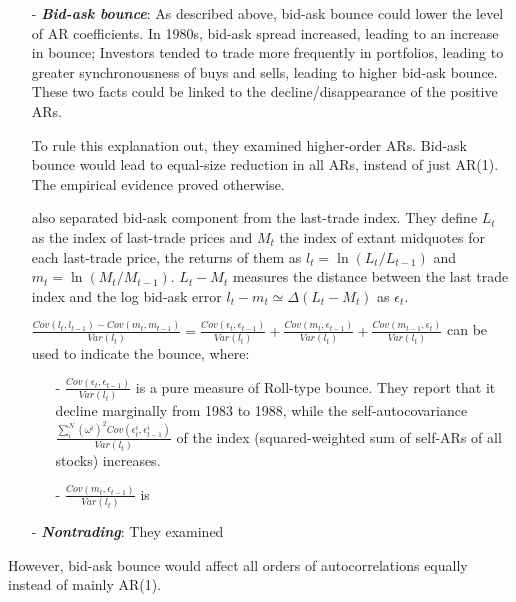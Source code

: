 \begin{enumerate}
    \item[-] \textbf{\textit{Bid-ask bounce}}: As described above, bid-ask bounce could lower the level of AR coefficients. In 1980s, bid-ask spread increased, leading to an increase in bounce; Investors tended to
    trade more frequently in portfolios, leading to greater synchronousness of buys and sells, leading to higher bid-ask bounce. These two facts could be linked to the decline/disappearance of the positive ARs.
    
    To rule this explanation out, they examined higher-order ARs. Bid-ask bounce would lead to equal-size reduction in all ARs, instead of just AR(1). The empirical evidence proved otherwise.
    
    \citeauthor{froot1995new} also separated bid-ask component from the last-trade index. They define $L_t$ as the index of last-trade prices and $M_t$ the index of extant midquotes for each last-trade price, the returns of them
    as $l_t=\ln(L_t/L_{t-1})$ and $m_t=\ln(M_t/M_{t-1})$. $L_t-M_t$ measures the distance between the last trade index and the log bid-ask error $l_t-m_t\simeq\Delta(L_t-M_t)$ as $\epsilon_t$. 

    $\frac{Cov(l_t,l_{t-1})-Cov(m_t,m_{t-1})}{Var(l_t)} = \frac{Cov(\epsilon_t,\epsilon_{t-1})}{Var(l_t)}+ \frac{Cov(m_t,\epsilon_{t-1})}{Var(l_t)}+\frac{Cov(m_{t-1},\epsilon_t)}{Var(l_t)}$ can be used to indicate the bounce, 
    where: 
    \begin{enumerate}
        \item[-] $\frac{Cov(\epsilon_t,\epsilon_{t-1})}{Var(l_t)}$ is a pure measure of Roll-type bounce. They report that it decline marginally from 1983 to 1988, while the self-autocovariance $\frac{\sum^N_i(\omega^i)^2Cov(\epsilon_t^i,\epsilon_{t-1}^i)}{Var(l_t)}$
        of the index (squared-weighted sum of self-ARs of all stocks) increases. 
        \item[-] $\frac{Cov(m_t,\epsilon_{t-1})}{Var(l_t)}$ is 
    \end{enumerate}
    
    
    \item[-] \textbf{\textit{Nontrading}}: They examined
\end{enumerate}
However, bid-ask bounce would affect all orders of autocorrelations equally instead of mainly AR(1). 